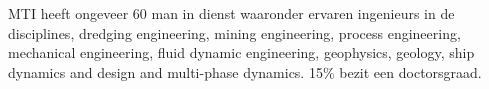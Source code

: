 \documentclass[a4paper,11pt]{../LatexDocStructures/MTItexMemo} %
\begin{document}
MTI heeft ongeveer 60 man in dienst waaronder ervaren ingenieurs in de disciplines, dredging engineering, mining engineering, process engineering, mechanical engineering, fluid dynamic engineering, geophysics, geology, ship dynamics and design and multi-phase dynamics. 15\% bezit een doctorsgraad.

\end{document}
